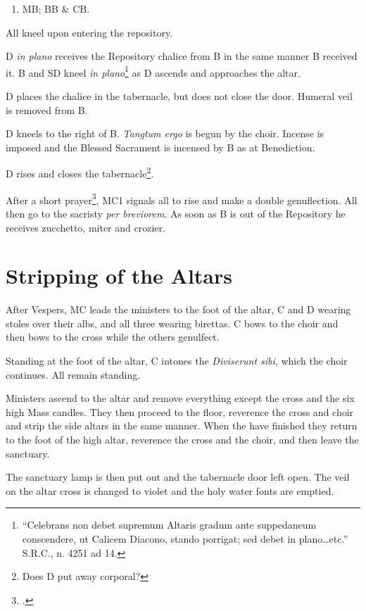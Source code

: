 {\begin{enumerate}
    \item MB; BB \& CB.

\end{enumerate}

\rubric All kneel upon entering the repository.

\rubric D \textit{in plano} receives the Repository chalice from B in the same
manner B received it. B and SD kneel \textit{in plano}\footnote{``Celebrans non
debet supremum Altaris gradum ante suppedaneum conscendere, ut Calicem Diacono,
stando porrigat; sed debet in plano\dots etc.'' S.R.C., n. 4251 ad 14.} as D
ascends and approaches the altar.

\rubric D places the chalice in the tabernacle, but does not close the door.
Humeral veil is removed from B.

\rubric D kneels to the right of B. \textit{Tangtum ergo} is begun by the
choir. Incense is imposed and the Blessed Sacrament is incensed by B as at
Benediction.

\rubric D rises and closes the tabernacle\footnote{Does D put away corporal?}.

\rubric After a short prayer\footcite[B is instructed to give a blessing at
this point with miter and crozier. Is this reserved to the Ordinary?][p.
192]{stehle}, MC1 signals all to rise and make a double genuflection. All then
go to the sacristy \textit{per breviorem}. As soon as B is out of the
Repository he receives zucchetto, miter and crozier.

\section{Stripping of the Altars}

\rubric After Vespers, MC leads the ministers to the foot of the altar, C and D
wearing stoles over their albs, and all three wearing birettas. C bows to the
choir and then bows to the cross while the others genulfect.

\rubric Standing at the foot of the altar, C intones the \textit{Diviserunt
sibi}, which the choir continues. All remain standing.

\rubric Ministers ascend to the altar and remove everything except the cross
and the six high Mass candles. They then proceed to the floor, reverence the
cross and choir and strip the side altars in the same manner. When the have
finished they return to the foot of the high altar, reverence the cross and the
choir, and then leave the sanctuary.

\rubric The sanctuary lamp is then put out and the tabernacle door left open.
The veil on the altar cross is changed to violet and the holy water fonts are
emptied.

}
